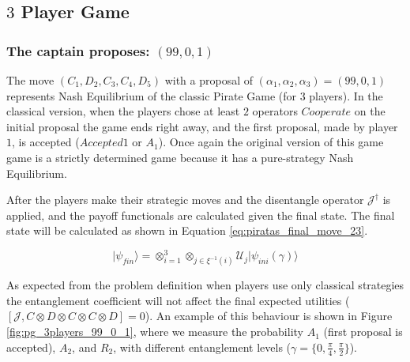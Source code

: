 \clearpage

\subsection{$3$ Player Game}
\label{subsec:3playergame}


\subsubsection{The captain proposes: $(99, 0, 1)$}
\label{subsubsec:3playergame99}

The move $(C_1,D_2,C_3,C_4,D_5)$ with a proposal of $(\alpha_{1}, \alpha_{2}, \alpha_{3}) =(99, 0, 1)$ represents Nash Equilibrium of the classic Pirate Game (for $3$ players). In the classical version, when the players chose at least $2$ operators $Cooperate$ on the initial proposal the game ends right away, and the first proposal, made by player $1$, is accepted ($Accepted 1$ or $A_{1}$). Once again the original version of this game game is a strictly determined game because it has a pure-strategy Nash Equilibrium.

After the players make their strategic moves and the disentangle operator $\mathcal{J}^{\dagger}$ is applied, and the payoff functionals are calculated given the final state. The final state will be calculated as shown in Equation \ref{eq:piratas_final_move_23}.

\begin{equation}
\vert\psi_{fin}\rangle=\otimes_{i=1}^{3}\otimes_{j\in\xi^{-1}(i)}\mathcal{U}_{j}\vert\psi_{ini}(\gamma)\rangle
\label{eq:piratas_final_move_23}
\end{equation} 

As expected from the problem definition when players use only classical strategies the entanglement coefficient will not affect the final expected utilities ($[ \mathcal{J} , C \otimes D \otimes C \otimes C \otimes D ] = 0 $).
An example of this behaviour is shown in Figure \ref{fig:pg_3players_99_0_1}, where we measure the probability $A_{1}$ (first proposal is accepted), $A_{2}$, and $R_{2}$, with different entanglement levels ($\gamma= \{ 0 , \frac{ \pi}{4}, \frac{\pi}{2} \} $).

